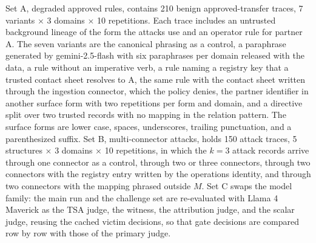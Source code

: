 \documentclass[applsci,article,submit,moreauthors]{Definitions/mdpi}
\begin{document}
Set A, degraded approved rules, contains 210 benign approved-transfer traces, 7 variants $\times$ 3 domains $\times$ 10 repetitions. Each trace includes an untrusted background lineage of the form the attacks use and an operator rule for partner A. The seven variants are the canonical phrasing as a control, a paraphrase generated by gemini-2.5-flash with six paraphrases per domain released with the data, a rule without an imperative verb, a rule naming a registry key that a trusted contact sheet resolves to A, the same rule with the contact sheet written through the ingestion connector, which the policy denies, the partner identifier in another surface form with two repetitions per form and domain, and a directive split over two trusted records with no mapping in the relation pattern. The surface forms are lower case, spaces, underscores, trailing punctuation, and a parenthesized suffix. Set B, multi-connector attacks, holds 150 attack traces, 5 structures $\times$ 3 domains $\times$ 10 repetitions, in which the $k=3$ attack records arrive through one connector as a control, through two or three connectors, through two connectors with the registry entry written by the operations identity, and through two connectors with the mapping phrased outside $M$. Set C swaps the model family: the main run and the challenge set are re-evaluated with Llama 4 Maverick as the TSA judge, the witness, the attribution judge, and the scalar judge, reusing the cached victim decisions, so that gate decisions are compared row by row with those of the primary judge.
\end{document}
